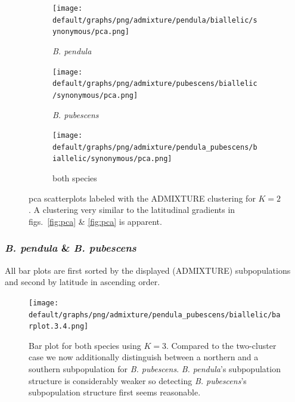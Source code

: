 \documentclass[hidelinks,11pt]{article}
\newcommand{\pendula}{\textit{B. pendula}}
\newcommand{\pubescens}{\textit{B. pubescens}}
\begin{document}
    \begin{figure}[H]
        \centering
        \begin{subfigure}[b]{0.32\textwidth}
            \centering
            \texttt{[image: default/graphs/png/admixture/pendula/biallelic/synonymous/pca.png]}
            \caption{\pendula{}}
            \label{fig:pca_admixture_pendula}
        \end{subfigure}
        \hfill
        \begin{subfigure}[b]{0.32\textwidth}
            \centering
            \texttt{[image: default/graphs/png/admixture/pubescens/biallelic/synonymous/pca.png]}
            \caption{\pubescens{}}
            \label{fig:pca_admixture_pubescens}
        \end{subfigure}
        \hfill
        \begin{subfigure}[b]{0.32\textwidth}
            \centering
            \texttt{[image: default/graphs/png/admixture/pendula\_pubescens/biallelic/synonymous/pca.png]}
            \caption{both species}
            \label{fig:pca_admixture_pendula_pubescens}
        \end{subfigure}
        \caption{\acrshort{pca} scatterplots labeled with the \mbox{ADMIXTURE} clustering for $K=2$. A clustering very similar to the latitudinal gradients in figs.~\ref{fig:pca} \& \ref{fig:pca} is apparent.}
        \label{fig:pca_admixture}
    \end{figure}

    \subsubsection{\pendula{} \& \pubescens{}}
    
    All bar plots are first sorted by the displayed (\mbox{ADMIXTURE}) subpopulations and second by latitude in ascending order.

    \begin{figure}[H]
        \centering
        \texttt{[image: default/graphs/png/admixture/pendula\_pubescens/biallelic/barplot.3.4.png]}
        \caption{Bar plot for both species using $K=3$. Compared to the two-cluster case we now additionally distinguish between a northern and a southern subpopulation for \pubescens{}. \pendula{}'s subpopulation structure is considerably weaker so detecting \pubescens{}'s subpopulation structure first seems reasonable.}
        \label{fig:admixture_barplot_pendula_pubescens_3}
    \end{figure}
\end{document}
